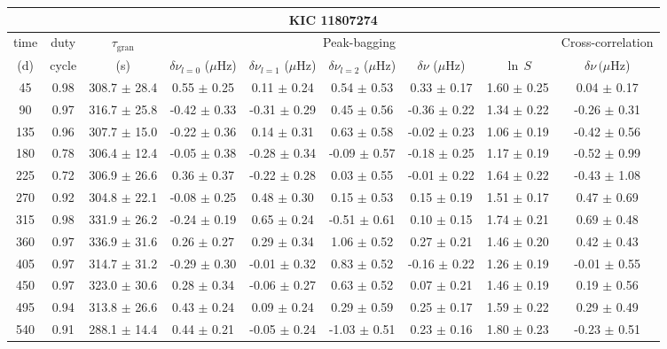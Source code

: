 \documentclass[twocolumn]{aastex61}%
\begin{document}
\begin{table*}[ht]\centering\fontsize{9.}{7.}\selectfont
\begin{tabular}{ccc|ccccc|c}
\multicolumn{9}{c}{KIC 11807274}\\ \hline\hline
time & duty & $\tau_\text{gran}$ &\multicolumn{5}{c|}{Peak-bagging}&Cross-correlation\\
(d)& cycle & (s)&$\delta\nu_{l=0}$ ($\mu$Hz) & $\delta\nu_{l=1}$ ($\mu$Hz) & $\delta\nu_{l=2}$ ($\mu$Hz) & $\delta\nu$ ($\mu$Hz)& $\ln\,S$ & $\delta\nu\,(\mu$Hz)\\\hline
45 & 0.98 & 308.7 $\pm$ 28.4 & 0.55 $\pm$ 0.25 & 0.11 $\pm$ 0.24 & 0.54 $\pm$ 0.53 & 0.33 $\pm$ 0.17 & 1.60 $\pm$ 0.25 & 0.04 $\pm$ 0.17\\
90 & 0.97 & 316.7 $\pm$ 25.8 & -0.42 $\pm$ 0.33 & -0.31 $\pm$ 0.29 & 0.45 $\pm$ 0.56 & -0.36 $\pm$ 0.22 & 1.34 $\pm$ 0.22 & -0.26 $\pm$ 0.31\\
135 & 0.96 & 307.7 $\pm$ 15.0 & -0.22 $\pm$ 0.36 & 0.14 $\pm$ 0.31 & 0.63 $\pm$ 0.58 & -0.02 $\pm$ 0.23 & 1.06 $\pm$ 0.19 & -0.42 $\pm$ 0.56\\
180 & 0.78 & 306.4 $\pm$ 12.4 & -0.05 $\pm$ 0.38 & -0.28 $\pm$ 0.34 & -0.09 $\pm$ 0.57 & -0.18 $\pm$ 0.25 & 1.17 $\pm$ 0.19 & -0.52 $\pm$ 0.99\\
225 & 0.72 & 306.9 $\pm$ 26.6 & 0.36 $\pm$ 0.37 & -0.22 $\pm$ 0.28 & 0.03 $\pm$ 0.55 & -0.01 $\pm$ 0.22 & 1.64 $\pm$ 0.22 & -0.43 $\pm$ 1.08\\
270 & 0.92 & 304.8 $\pm$ 22.1 & -0.08 $\pm$ 0.25 & 0.48 $\pm$ 0.30 & 0.15 $\pm$ 0.53 & 0.15 $\pm$ 0.19 & 1.51 $\pm$ 0.17 & 0.47 $\pm$ 0.69\\
315 & 0.98 & 331.9 $\pm$ 26.2 & -0.24 $\pm$ 0.19 & 0.65 $\pm$ 0.24 & -0.51 $\pm$ 0.61 & 0.10 $\pm$ 0.15 & 1.74 $\pm$ 0.21 & 0.69 $\pm$ 0.48\\
360 & 0.97 & 336.9 $\pm$ 31.6 & 0.26 $\pm$ 0.27 & 0.29 $\pm$ 0.34 & 1.06 $\pm$ 0.52 & 0.27 $\pm$ 0.21 & 1.46 $\pm$ 0.20 & 0.42 $\pm$ 0.43\\
405 & 0.97 & 314.7 $\pm$ 31.2 & -0.29 $\pm$ 0.30 & -0.01 $\pm$ 0.32 & 0.83 $\pm$ 0.52 & -0.16 $\pm$ 0.22 & 1.26 $\pm$ 0.19 & -0.01 $\pm$ 0.55\\
450 & 0.97 & 323.0 $\pm$ 30.6 & 0.28 $\pm$ 0.34 & -0.06 $\pm$ 0.27 & 0.63 $\pm$ 0.52 & 0.07 $\pm$ 0.21 & 1.46 $\pm$ 0.19 & 0.19 $\pm$ 0.56\\
495 & 0.94 & 313.8 $\pm$ 26.6 & 0.43 $\pm$ 0.24 & 0.09 $\pm$ 0.24 & 0.29 $\pm$ 0.59 & 0.25 $\pm$ 0.17 & 1.59 $\pm$ 0.22 & 0.29 $\pm$ 0.49\\
540 & 0.91 & 288.1 $\pm$ 14.4 & 0.44 $\pm$ 0.21 & -0.05 $\pm$ 0.24 & -1.03 $\pm$ 0.51 & 0.23 $\pm$ 0.16 & 1.80 $\pm$ 0.23 & -0.23 $\pm$ 0.51\\

\end{tabular}
\end{table*}
\end{document}
